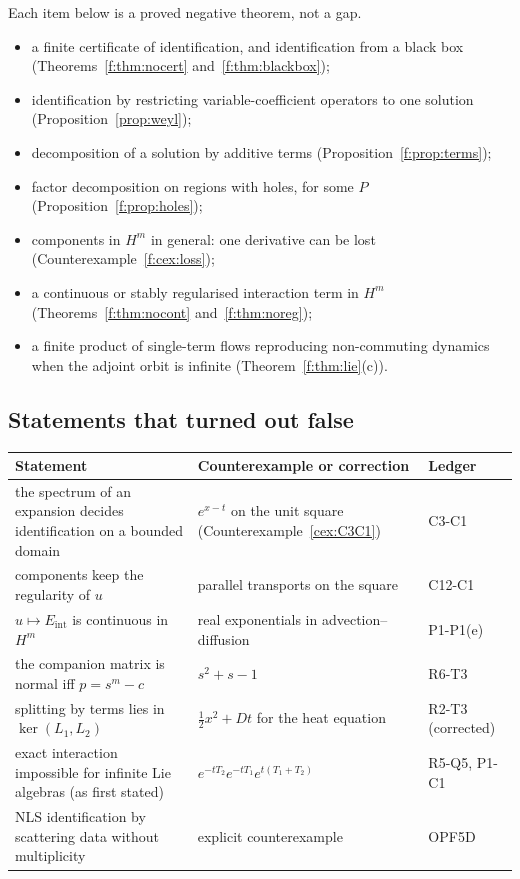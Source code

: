 \documentclass[11pt]{article}
\theoremstyle{plain}
\theoremstyle{definition}
\theoremstyle{remark}
\newcommand{\Eint}{E_{\mathrm{int}}}        %
\begin{document}
Each item below is a proved negative theorem, not a gap.
\begin{itemize}
\item a finite certificate of identification, and identification from a black box (Theorems~\ref{f:thm:nocert} and~\ref{f:thm:blackbox});
\item identification by restricting variable-coefficient operators to one solution (Proposition~\ref{prop:weyl});
\item decomposition of a solution by additive terms (Proposition~\ref{f:prop:terms});
\item factor decomposition on regions with holes, for some $P$ (Proposition~\ref{f:prop:holes});
\item components in $H^m$ in general: one derivative can be lost (Counterexample~\ref{f:cex:loss});
\item a continuous or stably regularised interaction term in $H^m$ (Theorems~\ref{f:thm:nocont} and~\ref{f:thm:noreg});
\item a finite product of single-term flows reproducing non-commuting dynamics when the adjoint orbit is infinite (Theorem~\ref{f:thm:lie}(c)).
\end{itemize}

\subsection{Statements that turned out false}

\begin{center}\small
\begin{tabular}{@{}L{5.2cm}L{6.0cm}L{2.6cm}@{}}
\toprule
Statement & Counterexample or correction & Ledger\\\midrule
the spectrum of an expansion decides identification on a bounded domain & $e^{x-t}$ on the unit square (Counterexample~\ref{cex:C3C1}) & C3-C1\\
components keep the regularity of $u$ & parallel transports on the square & C12-C1\\
$u\mapsto\Eint$ is continuous in $H^m$ & real exponentials in advection--diffusion & P1-P1(e)\\
the companion matrix is normal iff $p=s^m-c$ & $s^2+s-1$ & R6-T3\\
splitting by terms lies in $\ker(L_1,L_2)$ & $\tfrac12x^2+Dt$ for the heat equation & R2-T3 (corrected)\\
exact interaction impossible for infinite Lie algebras (as first stated) & $e^{-tT_2}e^{-tT_1}e^{t(T_1+T_2)}$ & R5-Q5, P1-C1\\
NLS identification by scattering data without multiplicity & explicit counterexample & OPF5D\\\bottomrule
\end{tabular}
\end{center}
\end{document}
